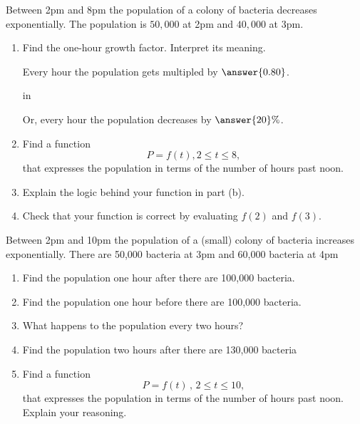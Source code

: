 \documentclass{ximera}
\newcommand{\pskip}{\vskip 0.1 in}
\begin{document}
\begin{example}  \label{Ex432234e3r}
Between 2pm and 8pm the population of a colony of bacteria decreases exponentially. The population is $50,000$ at 2pm and $40,000$ at 3pm.

\begin{enumerate}
\item Find the one-hour growth factor. Interpret its meaning.

Every hour the population gets multipled by $\answer{0.80}$.

\pskip

Or, every hour the population decreases by $\answer{20}\%$.

\item Find a function
\[
        P = f(t) , 2\leq t \leq 8 ,   
\] 
that expresses the population in terms of the number of hours past noon.

\item Explain the logic behind your function in part (b).

\item Check that your function is correct by evaluating $f(2)$ and $f(3)$.
\end{enumerate}
\end{example}


\begin{example}  \label{Ex4556511111}
Between 2pm and 10pm the population of a (small) colony of bacteria increases exponentially. There are 50,000 bacteria at 3pm and 60,000 bacteria at 4pm

\begin{enumerate}
\item Find the population one hour after there are 100,000 bacteria.

\item Find the population one hour before there are 100,000 bacteria.

\item What happens to the population every two hours?

\item Find the population two hours after there are 130,000 bacteria

\item Find a function 
\[
      P = f(t) \, , \, 2\leq t \leq 10 ,
\]
that expresses the population in terms of the number of hours past noon. Explain your reasoning.
\end{enumerate}
\end{example}
\end{document}
